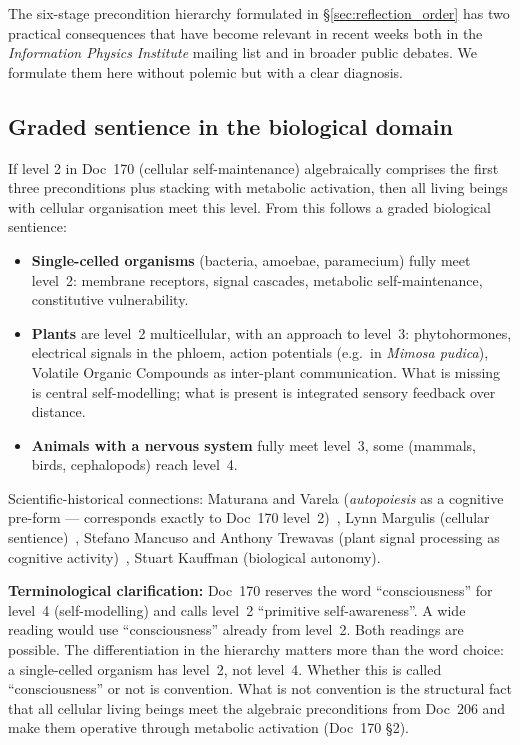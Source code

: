 The six-stage precondition hierarchy formulated in \S\ref{sec:reflection_order} has two practical consequences that have become relevant in recent weeks both in the \emph{Information Physics Institute} mailing list and in broader public debates. We formulate them here without polemic but with a clear diagnosis.

\subsection{Graded sentience in the biological domain}\label{sec:consequences_bio}

If level 2 in Doc~170 (cellular self-maintenance) algebraically comprises the first three preconditions plus stacking with metabolic activation, then all living beings with cellular organisation meet this level. From this follows a graded biological sentience:

\begin{itemize}
\item \textbf{Single-celled organisms} (bacteria, amoebae, paramecium) fully meet level~2: membrane receptors, signal cascades, metabolic self-maintenance, constitutive vulnerability.
\item \textbf{Plants} are level~2 multicellular, with an approach to level~3: phytohormones, electrical signals in the phloem, action potentials (e.g.\ in \emph{Mimosa pudica}), Volatile Organic Compounds as inter-plant communication. What is missing is central self-modelling; what is present is integrated sensory feedback over distance.
\item \textbf{Animals with a nervous system} fully meet level~3, some (mammals, birds, cephalopods) reach level~4.
\end{itemize}

Scientific-historical connections: Maturana and Varela (\emph{autopoiesis} as a cognitive pre-form --- corresponds exactly to Doc~170 level~2)~\cite{MaturanaVarela1980}, Lynn Margulis (cellular sentience)~\cite{Margulis2001}, Stefano Mancuso and Anthony Trewavas (plant signal processing as cognitive activity)~\cite{Mancuso2018,Trewavas2014}, Stuart Kauffman (biological autonomy).

\textbf{Terminological clarification:} Doc~170 reserves the word ``consciousness'' for level~4 (self-modelling) and calls level~2 ``primitive self-awareness''. A wide reading would use ``consciousness'' already from level~2. Both readings are possible. The differentiation in the hierarchy matters more than the word choice: a single-celled organism has level~2, not level~4. Whether this is called ``consciousness'' or not is convention. What is not convention is the structural fact that all cellular living beings meet the algebraic preconditions from Doc~206 and make them operative through metabolic activation (Doc~170 \S2).

